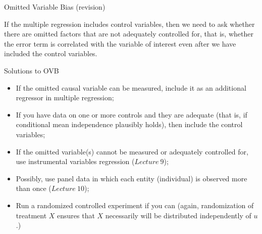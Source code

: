 \documentclass[notes,10pt, aspectratio=169]{beamer}
\begin{document}
\begin{frame}{Omitted Variable Bias (revision)}
\begin{center}
\begin{figure}
{

}
\end{figure}
\end{center}

If the multiple regression includes control variables, then we need to ask whether there are omitted factors that are not adequately controlled for, that is, whether the error term is correlated with the variable of interest even after we have included the control variables.
\end{frame}

\begin{frame}{Solutions to OVB}

\begin{itemize}
    \item If the omitted causal variable can be measured, include it as an additional regressor in multiple regression;\\[1em]
    \item If you have data on one or more controls and they are adequate (that is, if conditional mean independence plausibly holds), then include the control variables;\\[1em]
    \item If the omitted variable(s) cannot be measured or adequately controlled for, use instrumental variables regression ($Lecture~9$);\\[1em]
    \item Possibly, use panel data in which each entity (individual) is observed more than once ($Lecture~10$);\\[1em]
    \item Run a randomized controlled experiment if you can (again, randomization of treatment $X$ ensures that $X$ necessarily will be distributed independently of $u$.)
\end{itemize}
\end{frame}
\end{document}
